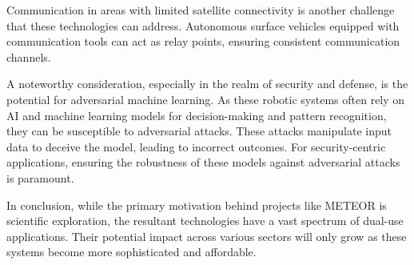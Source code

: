 Communication in areas with limited satellite connectivity is another challenge that these technologies can address. Autonomous surface vehicles equipped with communication tools can act as relay points, ensuring consistent communication channels.

A noteworthy consideration, especially in the realm of security and defense, is the potential for adversarial machine learning. As these robotic systems often rely on AI and machine learning models for decision-making and pattern recognition, they can be susceptible to adversarial attacks. These attacks manipulate input data to deceive the model, leading to incorrect outcomes. For security-centric applications, ensuring the robustness of these models against adversarial attacks is paramount.

In conclusion, while the primary motivation behind projects like METEOR is scientific exploration, the resultant technologies have a vast spectrum of dual-use applications. Their potential impact across various sectors will only grow as these systems become more sophisticated and affordable.